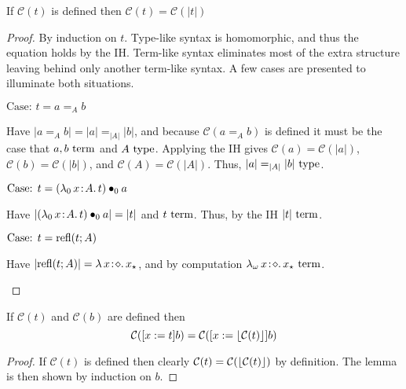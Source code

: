 \begin{lemma}
    \label{lem:2:classify_erase}
    If $\mathcal{C}(t)$ is defined then $\mathcal{C}(t) = \mathcal{C}(|t|)$
\end{lemma}
\begin{proof}
    By induction on $t$.
    Type-like syntax is homomorphic, and thus the equation holds by the IH.
    Term-like syntax eliminates most of the extra structure leaving behind only another term-like syntax.
    A few cases are presented to illuminate both situations.

    $\text{Case: }t = a =_A b$
    \begin{proofcase}
        Have $|a =_A b| = |a| =_{|A|} |b|$, and because $\mathcal{C}(a =_A b)$ is defined it must be the case that $a, b~\textnormal{term}$ and $A~\textnormal{type}$.
        Applying the IH gives $\mathcal{C}(a) = \mathcal{C}(|a|)$, $\mathcal{C}(b) = \mathcal{C}(|b|)$, and $\mathcal{C}(A) = \mathcal{C}(|A|)$.
        Thus, $|a| =_{|A|} |b|~\textnormal{type}$.
    \end{proofcase}

    $\text{Case: }t = ({\lambda_0}\, x\! : \! A.\, t) \bullet_{0} a$
    \begin{proofcase}
        Have $|({\lambda_0}\, x\! : \! A.\, t) \bullet_{0} a| = |t|$ and $t~\textnormal{term}$.
        Thus, by the IH $|t|~\textnormal{term}$.
    \end{proofcase}
    
    $\text{Case: }t = \textnormal{refl}(t; A)$
    \begin{proofcase}
        Have $|\textnormal{refl}(t; A)| = {\lambda}\, x\! : \! \diamond.\, x_\star$, and by computation ${\lambda_\omega}\, x\! : \! \diamond.\, x_\star~\textnormal{term}$.
    \end{proofcase}
\end{proof}

\begin{lemma}
    \label{lem:2:classify_subst}
    If $\mathcal{C}(t)$ and $\mathcal{C}(b)$ are defined then $$\mathcal{C}([x := t]b) = \mathcal{C}([x := \lfloor \mathcal{C}(t) \rfloor]b)$$
\end{lemma}
\begin{proof}
    If $\mathcal{C}(t)$ is defined then clearly $\mathcal{C}(t) = \mathcal{C}(\lfloor \mathcal{C}(t) \rfloor)$ by definition.
    The lemma is then shown by induction on $b$.
\end{proof}

